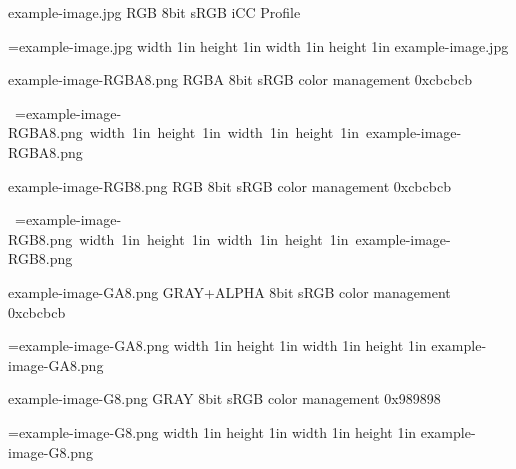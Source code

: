 


example-image.jpg RGB 8bit sRGB iCC Profile

\vbox{%
\ifhint
\HINTimage=example-image.jpg width 1in height 1in \relax
\else
\pdfximage width 1in height 1in {example-image.jpg}\pdfrefximage\pdflastximage
\fi
}

example-image-RGBA8.png RGBA 8bit sRGB color management 0xcbcbcb

\hbox{%
\ifhint
\HINTimage=example-image-RGBA8.png width 1in height 1in \relax
\else
\pdfximage width 1in height 1in {example-image-RGBA8.png}\pdfrefximage\pdflastximage
\fi
}

example-image-RGB8.png RGB 8bit sRGB color management 0xcbcbcb

\hbox{%
\ifhint
\HINTimage=example-image-RGB8.png width 1in height 1in \relax
\else
\pdfximage width 1in height 1in {example-image-RGB8.png}\pdfrefximage\pdflastximage
\fi
}

example-image-GA8.png GRAY+ALPHA 8bit sRGB color management 0xcbcbcb

\ifhint
\HINTimage=example-image-GA8.png width 1in height 1in \relax
\else
\pdfximage width 1in height 1in {example-image-GA8.png}\pdfrefximage\pdflastximage
\fi

example-image-G8.png GRAY 8bit sRGB color management 0x989898

\ifhint
\HINTimage=example-image-G8.png width 1in height 1in \relax
\else
\pdfximage width 1in height 1in {example-image-G8.png}\pdfrefximage\pdflastximage
\fi

\vfill
\bye
